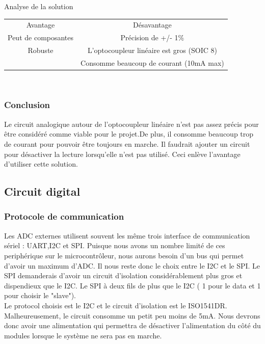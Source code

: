 \documentclass[12pt,letterpaper]{article}
\begin{document}
\begin{normalsize}
\begin{center}
						Analyse de la solution \\ \vspace{0.25cm}
						\begin{tabular}{|c|c|}
							\hline
							Avantage & D\'{e}savantage\\ \hhline{|=|=|}
							Peut de composantes & Pr\'{e}cision de +/- 1\% \\ \hline
							Robuste & L'optocoupleur lin\'{e}aire est gros (SOIC 8)\\ \hline
							 & Consomme beaucoup de courant (10mA max)\\ \hline
						\end{tabular} \\ \vspace{0.5cm}
					\end{center} 
				\subsubsection{Conclusion}
				Le circuit analogique autour de l'optocoupleur lin\'{e}aire n'est pas assez pr\'{e}cis pour \^{e}tre consid\'{e}r\'{e} comme viable pour le projet.De plus, il consomme beaucoup trop de courant pour pouvoir \^{e}tre toujours en marche. Il faudrait ajouter un circuit pour d\'{e}sactiver la lecture lorsqu'elle n'est pas utilis\'{e}. Ceci enl\`{e}ve l'avantage d'utiliser cette solution. 
				\newpage
				
			\subsection{Circuit digital}
				\subsubsection{Protocole de communication}
					Les ADC externes utilisent souvent les m\^{e}me trois interface de communication s\'{e}riel : UART,I2C et SPI. Puisque nous avons un nombre limit\'{e} de ces periph\'{e}rique sur le microcontr\^{o}leur, nous aurons besoin d'un bus qui permet d'avoir un maximum d'ADC. Il nous reste donc le choix entre le I2C et le SPI. Le SPI demanderais d'avoir un circuit d'isolation consid\'{e}rablement plus gros et dispendieux que le I2C. Le SPI \`{a} deux fils de plus que le I2C ( 1 pour le data et 1 pour choisir le "slave"). \\
					Le protocol choisis est le I2C et le circuit d'isolation est le ISO1541DR. Malheureusement, le circuit consomme un petit peu moins de 5mA. Nous devrons donc avoir une alimentation qui permettra de d\'{e}sactiver l'alimentation du c\^{o}t\'{e} du modules lorsque le syst\`{e}me ne sera pas en marche.
					

\end{normalsize}
\end{document}
